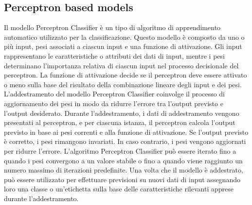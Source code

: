 \documentclass[italian,12pt,a4paper]{article}
\begin{document}
    \subsection{Perceptron based models}
    Il modello Perceptron Classifier è un tipo di algoritmo di apprendimento automatico utilizzato per la classificazione. Questo modello è composto da uno o più input, pesi associati a ciascun input e una funzione di attivazione. Gli input rappresentano le caratteristiche o attributi dei dati di input, mentre i pesi determinano l'importanza relativa di ciascun input nel processo decisionale del perceptron. La funzione di attivazione decide se il perceptron deve essere attivato o meno sulla base del risultato della combinazione lineare degli input e dei pesi. L'addestramento del modello Perceptron Classifier coinvolge il processo di aggiornamento dei pesi in modo da ridurre l'errore tra l'output previsto e l'output desiderato. Durante l'addestramento, i dati di addestramento vengono presentati al perceptron, e per ciascuna istanza, il perceptron calcola l'output previsto in base ai pesi correnti e alla funzione di attivazione. Se l'output previsto è corretto, i pesi rimangono invariati. In caso contrario, i pesi vengono aggiornati per ridurre l'errore. L'algoritmo Perceptron Classifier può essere iterato fino a quando i pesi convergono a un valore stabile o fino a quando viene raggiunto un numero massimo di iterazioni predefinite. Una volta che il modello è addestrato, può essere utilizzato per effettuare previsioni su nuovi dati di input assegnando loro una classe o un'etichetta sulla base delle caratteristiche rilevanti apprese durante l'addestramento.
    
\end{document}
